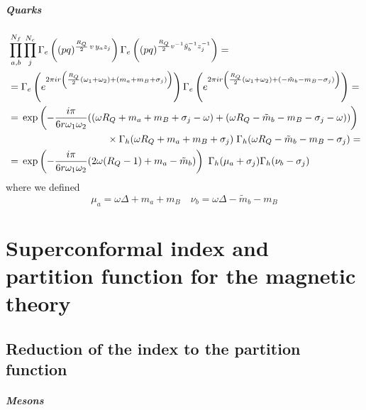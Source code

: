 \begin{appendices}
\paragraph{Quarks}
\begin{equation}
\begin{aligned}
&\prod_{a,b}^{N_f} \prod_{j}^{N_c}
\Gamma_e\left(
(pq)^{\frac{R_Q}{2} \, v \,  y_a z_j }\right) 
\Gamma_e\left(
(pq)^{\frac{R_Q}{2} v^{-1} \tilde y_b^{-1} z_j^{-1} } \right)  = \\
& =
\Gamma_e\left( e^{2 \pi i  r  \left( {R_Q \over 2} (\omega_1 + \omega_2)  + ( m_a + m_B + \sigma_j) \right) } \right )
\Gamma_e\left( e^{2 \pi i r  \left( {R_Q \over 2} (\omega_1 + \omega_2) + ( -\tilde{m}_b - m_B - \sigma_j) \right) } \right) = \\
& =   \,\exp \left( {- \frac{i \pi} {6 r \omega_1 \omega_2 }  ( ( \omega R_Q + m_a + m_B + \sigma_j -  \omega) + ( \omega R_Q -\tilde{m}_b - m_B - \sigma_j -  \omega))} \right) \\
& \qquad  \qquad \qquad \qquad \qquad  \times \Gamma_h ( \omega R_Q + m_a + m_B + \sigma_j) \; \Gamma_h ( \omega R_Q - \tilde{m}_b - m_B - \sigma_j) = \\
& =\, \exp \left( {- \frac{i \pi} {6 r \omega_1 \omega_2 }  ( 2 \omega (R_Q - 1) + m_a - \tilde{m}_b )} \right)  \, \, \Gamma_h ( \mu_a + \sigma_j) \Gamma_h ( \nu_b - \sigma_j)
\end{aligned}
\end{equation}
where we defined
\begin{equation}
 \mu_a = \omega \Delta + m_a + m_B  \quad  \nu_b = \omega \Delta - \tilde m_b - m_B
\end{equation}


\chapter[Index and PF for the magnetic theory]{Superconformal index and 
partition function for the magnetic theory}
\label{appendix:magnetic_theory_calculations}
\section{Reduction of the index to the partition function}
\paragraph{Mesons}


\end{appendices}

